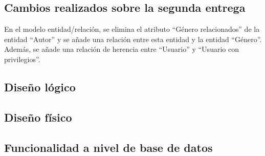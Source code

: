 \subsection{Cambios realizados sobre la segunda entrega}

En el modelo entidad/relación, se elimina el atributo ``Género relacionados'' de la entidad ``Autor'' y se añade una relación entre esta entidad y la entidad ``Género''. Además, se añade una relación de herencia entre ``Usuario'' y ``Usuario con privilegios''.

\subsection{Diseño lógico}

\subsection{Diseño físico}

\subsection{Funcionalidad a nivel de base de datos}
